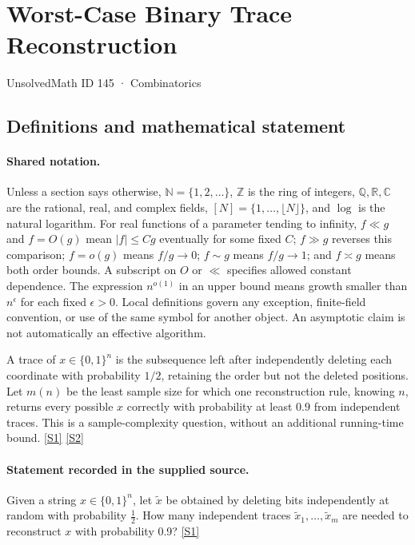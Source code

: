 \documentclass[11pt,a4paper]{article}
\newcommand{\N}{\mathbb{N}}
\newcommand{\Z}{\mathbb{Z}}
\newcommand{\Q}{\mathbb{Q}}
\newcommand{\R}{\mathbb{R}}
\newcommand{\C}{\mathbb{C}}
\newcommand{\sref}[2]{\hyperlink{source:#1:#2}{[S#2]}}
\begin{document}

\setcounter{section}{144}

\section{Worst-Case Binary Trace Reconstruction}\label{145}

{\small\sffamily UnsolvedMath ID 145 · Combinatorics}

\subsection{Definitions and mathematical statement}

\paragraph{Shared notation.}Unless a section says otherwise, $\N=\{1,2,\ldots\}$,
$\Z$ is the ring of integers, $\Q,\R,\C$ are the rational, real, and complex
fields, $[N]=\{1,\ldots,\lfloor N\rfloor\}$, and $\log$ is the natural
logarithm. For real functions of a parameter tending to infinity,
$f\ll g$ and $f=O(g)$ mean $|f|\leq Cg$ eventually for some fixed $C$;
$f\gg g$ reverses this comparison; $f=o(g)$ means $f/g\to0$;
$f\sim g$ means $f/g\to1$; and $f\asymp g$ means both order bounds.
A subscript on $O$ or $\ll$ specifies allowed constant dependence.
The expression $n^{o(1)}$ in an upper bound means growth smaller than
$n^\epsilon$ for each fixed $\epsilon>0$. Local definitions govern any
exception, finite-field convention, or use of the same symbol for another
object. An asymptotic claim is not automatically an effective algorithm.



A trace of $x\in\{0,1\}^n$ is the subsequence left after independently deleting each coordinate with probability $1/2$, retaining the order but not the deleted positions. Let $m(n)$ be the least sample size for which one reconstruction rule, knowing $n$, returns every possible $x$ correctly with probability at least $0.9$ from independent traces. This is a sample-complexity question, without an additional running-time bound. \sref{145}{1} \sref{145}{2}

\paragraph{Statement recorded in the supplied source.}
Given a string $x \in \{0, 1\}^n$, let $\tilde{x}$ be obtained by deleting bits independently at random with probability $\frac{1}{2}$. How many independent traces $\tilde{x}_1, \dots, \tilde{x}_m$ are needed to reconstruct $x$ with probability 0.9? \sref{145}{1}
\end{document}
